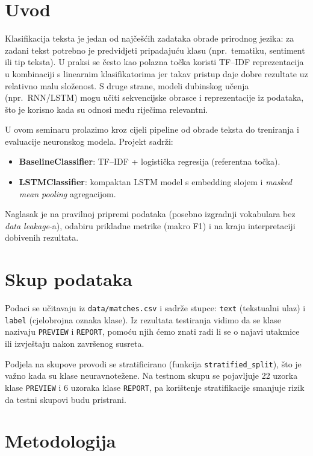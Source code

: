 \documentclass[12pt,a4paper]{article}
\begin{document}
\section{Uvod}
Klasifikacija teksta je jedan od najčešćih zadataka obrade prirodnog jezika: za zadani tekst
potrebno je predvidjeti pripadajuću klasu (npr.\ tematiku, sentiment ili tip teksta). U praksi se
često kao polazna točka koristi TF--IDF reprezentacija u kombinaciji s linearnim klasifikatorima
jer takav pristup daje dobre rezultate uz relativno malu složenost. S druge strane, modeli
dubinskog učenja (npr.\ RNN/LSTM) mogu učiti sekvencijske obrasce i reprezentacije iz podataka,
što je korisno kada su odnosi među riječima relevantni.

U ovom seminaru prolazimo kroz cijeli pipeline od obrade teksta do treniranja i evaluacije
neuronskog modela. Projekt sadrži:
\begin{itemize}
  \item \textbf{BaselineClassifier}: TF--IDF + logistička regresija (referentna točka).
  \item \textbf{LSTMClassifier}: kompaktan LSTM model s embedding slojem i \emph{masked mean pooling} agregacijom.
\end{itemize}
Naglasak je na pravilnoj pripremi podataka (posebno izgradnji vokabulara bez \emph{data leakage}-a),
odabiru prikladne metrike (makro F1) i na kraju interpretaciji dobivenih rezultata.

\section{Skup podataka}
Podaci se učitavaju iz \texttt{data/matches.csv} i sadrže stupce:
\texttt{text} (tekstualni ulaz) i \texttt{label} (cjelobrojna oznaka klase).
Iz rezultata testiranja vidimo da se klase nazivaju \texttt{PREVIEW} i \texttt{REPORT},
pomoću njih ćemo znati radi li se o najavi utakmice ili izvještaju nakon završenog susreta.

Podjela na skupove provodi se stratificirano (funkcija \texttt{stratified\_split}),
što je važno kada su klase neuravnotežene. Na testnom skupu se pojavljuje 22 uzorka klase
\texttt{PREVIEW} i 6 uzoraka klase \texttt{REPORT}, pa korištenje stratifikacije smanjuje rizik
da testni skupovi budu pristrani.

\section{Metodologija}
\end{document}
